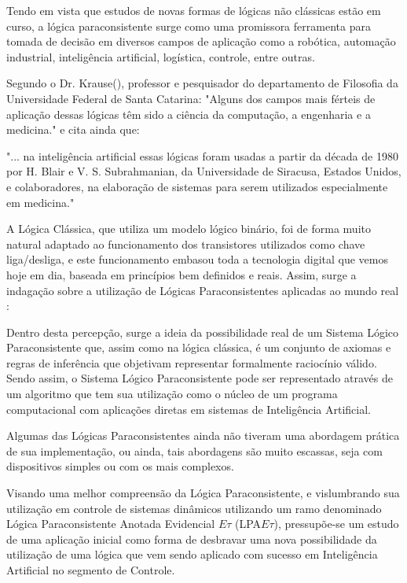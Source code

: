 
Tendo em vista que estudos de novas formas de lógicas não clássicas estão em curso, a lógica paraconsistente surge como uma promissora ferramenta para tomada de decisão em diversos campos de aplicação como a robótica, automação industrial, inteligência artificial, logística, controle, entre outras\cite{JoaoInacio}.
 
Segundo o Dr. Krause(\citeyear{DecioKrause}), professor e pesquisador do departamento de Filosofia da Universidade Federal de Santa Catarina: "Alguns dos campos mais férteis de aplicação dessas lógicas têm sido a ciência da computação, a engenharia e a medicina." e cita ainda que:
\begin{citacao}{
 "... na inteligência artificial essas lógicas foram usadas a partir da década de 1980 por H. Blair e V. S. Subrahmanian, da Universidade de Siracusa, Estados Unidos, e colaboradores, na elaboração de sistemas para serem utilizados especialmente em medicina." 
}
\end{citacao}

A Lógica Clássica, que utiliza um modelo lógico binário, foi de forma
muito natural adaptado ao funcionamento dos transistores utilizados
como chave liga/desliga, e este funcionamento embasou toda a
tecnologia digital que vemos hoje em dia, baseada em princípios bem
definidos e reais. Assim, surge a indagação sobre a utilização de
Lógicas Paraconsistentes aplicadas ao mundo real \cite{JISF2011}:

\begin{citacao}{
Dentro desta percepção, surge a ideia da possibilidade real de um Sistema Lógico Paraconsistente que, assim como na lógica clássica, é um conjunto de axiomas e regras de inferência que objetivam representar formalmente raciocínio válido. Sendo assim, o Sistema Lógico Paraconsistente pode ser representado através de um algoritmo que tem sua utilização como o núcleo de um programa computacional com aplicações diretas em sistemas de Inteligência Artificial.
}
\end{citacao}



Algumas das Lógicas Paraconsistentes ainda não tiveram  uma abordagem prática de sua implementação, ou ainda, tais abordagens são muito escassas, seja com dispositivos simples ou com os mais complexos. 

Visando uma melhor compreensão da Lógica Paraconsistente, 
e vislumbrando sua utilização em controle de sistemas dinâmicos 
utilizando um ramo denominado 
Lógica Paraconsistente Anotada Evidencial $E\tau$ (LPA$E\tau$), 
pressupõe-se um estudo de uma aplicação inicial 
como forma de desbravar uma nova possibilidade da utilização 
de uma lógica que vem sendo aplicado com sucesso em 
Inteligência Artificial no segmento de Controle.




